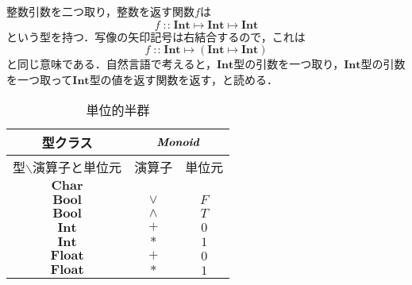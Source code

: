 \documentclass[twocolumn]{jsbook}
\newcommand{\hsklType}[1]{\textbf{#1}}
\newcommand{\hsklTypeClass}[1]{\textbf{\emph{#1}}}
\newcommand{\hsklBool}{\hsklType{Bool}}
\newcommand{\hsklChar}{\hsklType{Char}}
\newcommand{\hsklInt}{\hsklType{Int}}
\newcommand{\hsklFloat}{\hsklType{Float}}
\newcommand{\hsklMonoid}{\hsklTypeClass{Monoid}}
\DeclareMathOperator{\mathIn}{:\!:}
\DeclareMathOperator{\mathMapsTo}{\mapsto}
\newcommand{\mathMorphII}[3]{#1\mathMapsTo#2\mathMapsTo#3}
\newcommand{\mathMorphIIWithParenthesis}[3]{#1\mathMapsTo(#2\mathMapsTo#3)}
\begin{document}

整数引数を二つ取り，整数を返す関数$f$は
\begin{equation*}
f\mathIn\mathMorphII{\hsklInt}{\hsklInt}{\hsklInt}
\end{equation*}
という型を持つ．写像の矢印記号は右結合するので，これは
\begin{equation*}
f\mathIn\mathMorphIIWithParenthesis{\hsklInt}{\hsklInt}{\hsklInt}
\end{equation*}
と同じ意味である．自然言語で考えると，$\hsklInt$型の引数を一つ取り，$\hsklInt$型の引数を一つ取って$\hsklInt$型の値を返す関数を返す，と読める．

\begin{table}
\caption{単位的半群}
\label{tab:monoids}
\begin{center}
\begin{tabular}{||c||c|c||}
\hline
型クラス
    &\multicolumn{2}{|c||}{$\hsklMonoid$}\\
\hline\hline
型$\backslash$演算子と単位元
    &演算子
    &単位元\\
\hline
$\hsklChar$
    &
    &\\
\hline
$\hsklBool$
    &$\vee$
    &$F$\\
\hline
$\hsklBool$
    &$\wedge$
    &$T$\\
\hline
$\hsklInt$
    &$+$
    &$0$\\
\hline
$\hsklInt$
    &$*$
    &$1$\\
\hline
$\hsklFloat$
    &$+$
    &$0$\\
\hline
$\hsklFloat$
    &$*$
    &$1$\\
\hline
\end{tabular}
\end{center}
\end{table}
\end{document}
